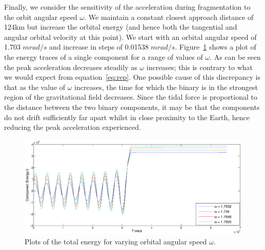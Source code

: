 \documentclass[letterpaper, preprint, paper,11pt]{AAS}	%
\begin{document}
 Finally, we consider the sensitivity of the acceleration during fragmentation to the orbit angular speed $\omega$. We maintain a constant closest approach distance of 124km but increase the orbital energy (and hence both the tangential and angular orbital velocity at this point). We start with an orbital angular speed of 1.703 $mrad/s$ and increase in steps of 0.01538 $mrad/s$. Figure~\ref{fig:omegasens} shows a plot of the energy traces of a single component for a range of values of $\omega$. As can be seen the peak acceleration decreases steadily as $\omega$ increases; this is contrary to what we would expect from equation~\ref{eq:rep}. One possible cause of this discrepancy is that as the value of $\omega$ increases, the time for which the binary is in the strongest region of the gravitational field decreases. Since the tidal force is proportional to the distance between the two binary components, it may be that the components do not drift sufficiently far apart whilst in close proximity to the Earth, hence reducing the peak acceleration experienced.
\begin{figure}[H]
\centering
\centerline{\includegraphics[width=1.2\textwidth]{omegasens.eps}} 
\caption{Plots of the total energy for varying orbital angular speed $\omega$.} 
\label{fig:omegasens}
\end{figure} 
\end{document}
